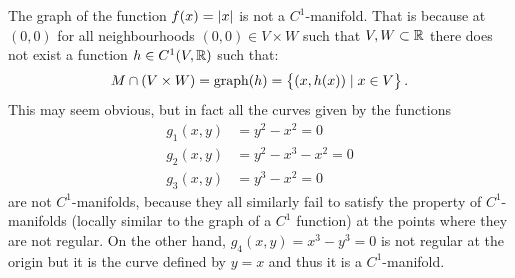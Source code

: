 \documentclass[11pt,a4paper]{article}
\begin{document}
\begin{example}
  The graph of the function $f(x) = \left\lvert x\right\rvert$ is not a $C^1$-manifold.
  That is because at $(0,0)$ for all neighbourhoods
  $(0,0) \in V \times W$ such that $V,W \subset \mathbb{R}$
  there does not exist a function
  $h \in C^1(V, \mathbb{R})$ such that:
  \[
    M \cap (V \times W) = \operatorname{graph}(h) = 
    \left\{(x,h(x)) \mid x \in V\right\}.
  \]
  This may seem obvious, but in fact all the curves given by
  the functions
  \begin{align*}
    g_1(x,y) &= y^2 - x^2 = 0 \\
    g_2(x,y) &= y^2 - x^3 - x^2 = 0 \\
    g_3(x,y) &= y^3 - x^2 = 0
  \end{align*}
  are not $C^1$-manifolds,
  because they all similarly fail to satisfy the property
  of $C^1$-manifolds (locally similar to the graph of a $C^1$ function)
  at the points where they are not regular.
  On the other hand, $g_4(x,y) = x^3 - y^3 = 0$ is not regular at the origin
  but it is the curve defined by $y = x$ and thus it is a $C^1$-manifold.
\end{example}
\end{document}
